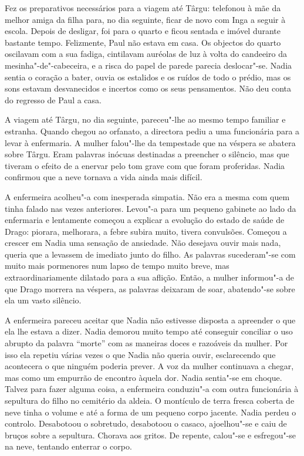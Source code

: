 Fez os preparativos necessários para a viagem até Târgu: telefonou à mãe
da melhor amiga da filha para, no dia seguinte, ficar de novo com Inga a
seguir à escola. Depois de desligar, foi para o quarto e ficou sentada e
imóvel durante bastante tempo. Felizmente, Paul não estava em casa. Os
objectos do quarto oscilavam com a sua fadiga, cintilavam auréolas de
luz à volta do candeeiro da mesinha"-de"-cabeceira, e a risca do papel de
parede parecia deslocar"-se. Nadia sentia o coração a bater, ouvia os
estalidos e os ruídos de todo o prédio, mas os sons estavam desvanecidos
e incertos como os seus pensamentos. Não deu conta do regresso de Paul
a casa.

A viagem até Târgu, no dia seguinte, pareceu"-lhe ao mesmo tempo familiar
e estranha. Quando chegou ao orfanato, a directora pediu a uma
funcionária para a levar à enfermaria. A mulher falou"-lhe da tempestade
que na véspera se abatera sobre Târgu. Eram palavras inócuas destinadas
a preencher o silêncio, mas que tiveram o efeito de a enervar pelo tom
grave com que foram proferidas. Nadia confirmou que a neve tornava a
vida ainda mais difícil.

A enfermeira acolheu"-a com inesperada simpatia. Não era a mesma com quem
tinha falado nas vezes anteriores. Levou"-a para um pequeno gabinete ao
lado da enfermaria e lentamente começou a explicar a evolução do estado
de saúde de Drago: piorara, melhorara, a febre subira muito, tivera
convulsões. Começou a crescer em Nadia uma sensação de ansiedade. Não
desejava ouvir mais nada, queria
que a levassem de imediato junto do filho. As palavras sucederam"-se com
muito mais pormenores num lapso de tempo muito breve, mas
extraordinariamente dilatado para a sua aflição. Então, a mulher
informou"-a de que Drago morrera na véspera, as palavras deixaram de
soar, abatendo"-se sobre ela um vasto silêncio.

A enfermeira pareceu aceitar que Nadia não estivesse disposta a
apreender o que ela lhe estava a dizer. Nadia demorou muito tempo até
conseguir conciliar o uso abrupto da palavra ``morte'' com as maneiras
doces e razoáveis da mulher. Por isso ela repetiu várias vezes o que
Nadia não queria ouvir, esclarecendo que acontecera o que ninguém
poderia prever. A voz da mulher continuava a chegar, mas como um
empurrão de encontro àquela dor. Nadia sentia"-se em choque. Talvez para
fazer alguma coisa, a enfermeira conduziu"-a com outra funcionária à
sepultura do filho no cemitério da aldeia. O montículo de terra fresca
coberta de neve tinha o volume e até a forma de um pequeno corpo
jacente. Nadia perdeu o controlo. Desabotoou o sobretudo, desabotoou o
casaco, ajoelhou"-se e caiu de bruços sobre a sepultura. Chorava aos
gritos. De repente, calou"-se e esfregou"-se na neve, tentando enterrar o
corpo.

